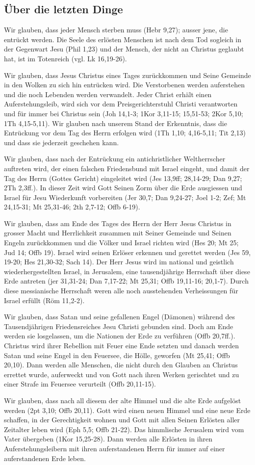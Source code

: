 \documentclass[12pt]{mybib}
\begin{document}
\subsection{Über die letzten Dinge}
Wir glauben, dass jeder Mensch sterben muss (Hebr 9,27); ausser jene, die entrückt werden. Die Seele des erlösten Menschen ist nach dem Tod sogleich in der Gegenwart Jesu (Phil 1,23) und der Mensch, der nicht an Christus geglaubt hat, ist im Totenreich (vgl. Lk 16,19-26).

Wir glauben, dass Jesus Christus eines Tages zurückkommen und Seine Gemeinde in den Wolken zu sich hin entrücken wird. Die Verstorbenen werden auferstehen und die noch Lebenden werden verwandelt. Jeder Christ erhält einen Auferstehungsleib, wird sich vor dem Preisgerichterstuhl Christi verantworten und für immer bei Christus sein (Joh 14,1-3; 1Kor 3,11-15; 15,51-53; 2Kor 5,10; 1Th 4,15-5,11). Wir glauben nach unserem Stand der Erkenntnis, dass die Entrückung vor dem Tag des Herrn erfolgen wird (1Th 1,10; 4,16-5,11; Tit 2,13) und dass sie jederzeit geschehen kann.

Wir glauben, dass nach der Entrückung ein antichristlicher Weltherrscher auftreten wird, der einen falschen Friedensbund mit Israel eingeht, und damit der Tag des Herrn (Gottes Gericht) eingeleitet wird (Jes 13,9ff; 28,14-29; Dan 9,27; 2Th 2,3ff.). In dieser Zeit wird Gott Seinen Zorm über die Erde ausgiessen und Israel für Jesu Wiederkunft vorbereiten (Jer 30,7; Dan 9,24-27; Joel 1-2; Zef; Mt 24,15-31; Mt 25,31-46; 2th 2,7-12; Offb 6-19).

Wir glauben, dass am Ende des Tages des Herrn der Herr Jesus Christus in grosser Macht und Herrlichkeit zusammen mit Seiner Gemeinde und Seinen Engeln zurückkommen und die Völker und Israel richten wird (Hes 20; Mt 25; Jud 14; Offb 19). Israel wird seinen Erlöser erkennen und gerettet werden (Jes 59, 19-20; Hes 21,30-32; Sach 14). Der Herr Jesus wird im national und geistlich wiederhergestellten Israel, in Jerusalem, eine tausendjährige Herrschaft über diese Erde antreten (jer 31,31-24; Dan 7,17-22; Mt 25,31; Offb 19,11-16; 20,1-7). Durch diese messianische Herrschaft weren alle noch ausstehenden Verheissungen für Israel erfüllt (Röm 11,2-2).

Wir glauben, dass Satan und seine gefallenen Engel (Dämonen) während des Tausendjährigen Friedensreiches Jesu Christi gebunden sind. Doch am Ende werden sie losgelassen, um die Nationen der Erde zu verführen (Offb 20,7ff.). Christus wird ihrer Rebellion mit Feuer eine Ende setzten und danach werden Satan und seine Engel in den Feuersee, die Hölle, geworfen (Mt 25,41; Offb 20,10). Dann werden alle Menschen, die nicht durch den Glauben an Christus errettet wurde, auferweckt und von Gott nach ihren Werken gerischtet und zu einer Strafe im Feuersee verurteilt (Offb 20,11-15).

Wir glauben, dass nach all diesem der alte Himmel und die alte Erde aufgelöst werden (2pt 3,10; Offb 20,11). Gott wird einen neuen Himmel und eine neue Erde schaffen, in der Gerechtigkeit wohnen und Gott mit allen Seinen Erlösten aller Zeitalter leben wird (Eph 5,5; Offb 21-22). Das himmlische Jerusalem wird vom Vater übergeben (1Kor 15,25-28). Dann werden alle Erlösten in ihren Auferstehungsleibern mit ihren auferstandenen Herrn für immer auf einer auferstandenen Erde leben.
\end{document}
